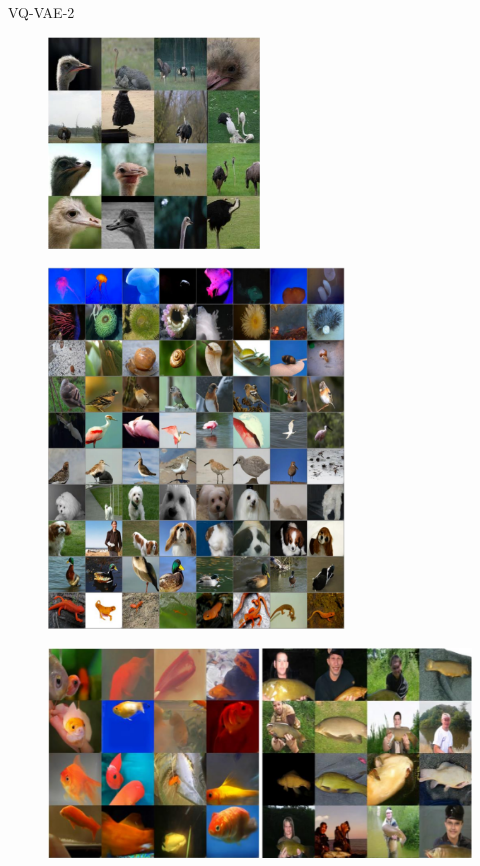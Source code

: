 \begin{frame}[allowframebreaks]

\begin{myconceptblock}{11.24}{VQ-VAE-2}
    \begin{figure}[H]
        \centering
        \includegraphics[width=0.5\textwidth]{.././assets/11.10.png}
    \end{figure}

    \begin{figure}[H]
        \centering
        \includegraphics[width=0.7\textwidth]{.././assets/11.11.png}
    \end{figure}

    \begin{figure}[H]
        \centering
        \includegraphics[width=1.0\textwidth]{.././assets/11.12.png}
    \end{figure}


\end{myconceptblock}
\end{frame}
